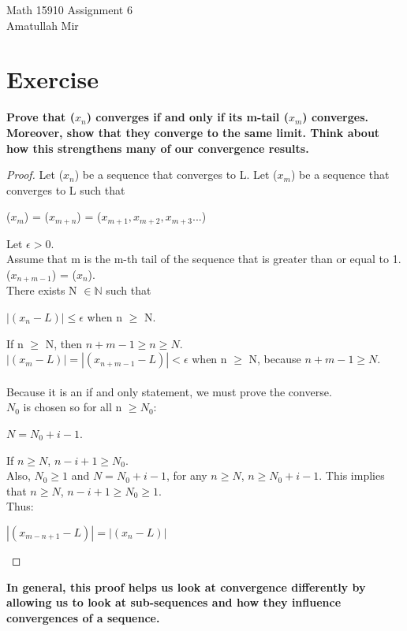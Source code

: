 \documentclass[12pt]{article}
\theoremstyle{definition}
\numberwithin{equation}{subsection}
\begin{document}
\pagestyle{plain}



\begin{center}
{\large Math 15910 Assignment 6} \\ 
{\medium Amatullah Mir} 

\vspace{.2in}  
\end{center}



\section{Exercise}
\textbf{Prove that ($x_{n}$) converges if and only if its m-tail ($x_{m}$) converges. Moreover, show that they converge to the same limit. Think about how this strengthens many of our convergence results.}

\begin{proof}
Let ($x_{n}$) be a sequence that converges to L.
Let ($x_{m}$) be a sequence that converges to L such that 
\begin{center}
    ($x_{m}$) = ($x_{m+n}$) = ($x_{m+1}, x_{m+2}, x_{m+3}...$) 
\end{center}
Let $\epsilon > 0$. \\
Assume that m is the m-th tail of the sequence that is greater than or equal to 1. \\
($x_{n+m-1}$) = ($x_{n}$). \\
There exists N $\in \mathbb{N}$ such that
\begin{center}
$|(x_{n} - L)| \leq \epsilon$ when n $\geq$ N.
\end{center}

If n $\geq$ N, then $n + m - 1 \geq n \geq N.$
\\
$|(x_{m} - L)| = |(x_{n + m - 1} - L)| < \epsilon$ when n $\geq$ N, because $n + m - 1 \geq N$.
\\
\\
Because it is an if and only statement, we must prove the converse.
\\
$N_{0}$ is chosen so for all n $\geq N_{0}$:
\begin{center}
    $N = N_{0} + i - 1$.
\end{center}
If $n \geq N$, $n - i + 1 \geq N_{0}$.
\\
Also, $N_{0} \geq 1$ and $N = N_{0} + i - 1$, for any $n \geq N$, $n \geq N_{0} + i - 1$.
This implies that $n \geq N$, $n - i + 1 \geq N_{0} \geq 1$.
\\
Thus:
\begin{center}
    $| (x_{m-n+1} - L) | = | (x_{n} - L)|$
\end{center}
\end{proof}

\textbf{In general, this proof helps us  look at convergence differently by allowing us to look at sub-sequences and how they influence convergences of a sequence.}
\end{document}
